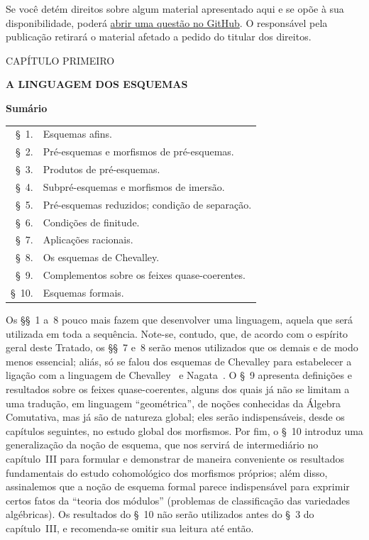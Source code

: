 \documentclass[oneside]{amsart}
\newcommand{\oldpage}[2][]{{\marginnote{\normalfont\textbf{#1}~|~#2}}\ignorespaces}
\let\EGAOriginalLabel\label
\renewcommand{\label}[1]{\phantomsection\EGAOriginalLabel{#1}}
\begin{document}
Se você detém direitos sobre algum material apresentado aqui e se opõe à sua disponibilidade, poderá \href{https://github.com/KokunoYumeto/ega-fga-sga-pt-br/issues}{abrir uma questão no GitHub}. O responsável pela publicação retirará o material afetado a pedido do titular dos direitos.

\par\endgroup\clearpage
\tableofcontents

\clearpage
\oldpage[I]{79}
\label{chapter:I-ptBR}

\begin{center}
{\large CAPÍTULO PRIMEIRO\par}
\vspace{1.5em}
{\Large\bfseries A LINGUAGEM DOS ESQUEMAS\par}
\vspace{1.8em}
{\bfseries Sumário\par}
\end{center}

\medskip
\begin{tabular}{@{}r@{\ }l@{}}
\S~1.  & Esquemas afins.\\
\S~2.  & Pré-esquemas e morfismos de pré-esquemas.\\
\S~3.  & Produtos de pré-esquemas.\\
\S~4.  & Subpré-esquemas e morfismos de imersão.\\
\S~5.  & Pré-esquemas reduzidos; condição de separação.\\
\S~6.  & Condições de finitude.\\
\S~7.  & Aplicações racionais.\\
\S~8.  & Os esquemas de Chevalley.\\
\S~9.  & Complementos sobre os feixes quase-coerentes.\\
\S~10. & Esquemas formais.
\end{tabular}

\medskip
Os \S\S~1 a~8 pouco mais fazem que desenvolver uma linguagem, aquela que será
utilizada em toda a sequência. Note-se, contudo, que, de acordo com o espírito
geral deste Tratado, os \S\S~7 e~8 serão menos utilizados que os demais e de
modo menos essencial; aliás, só se falou dos esquemas de Chevalley para
estabelecer a ligação com a linguagem de Chevalley~\cite{I-1} e
Nagata~\cite{I-9}. O \S~9 apresenta definições e resultados sobre os feixes
quase-coerentes, alguns dos quais já não se limitam a uma tradução, em
linguagem ``geométrica'', de noções conhecidas da Álgebra Comutativa, mas já
são de natureza global; eles serão indispensáveis, desde os capítulos
seguintes, no estudo global dos morfismos. Por fim, o \S~10 introduz uma
generalização da noção de esquema, que nos servirá de intermediário no
capítulo~III para formular e demonstrar de maneira conveniente os resultados
fundamentais do estudo cohomológico dos morfismos próprios; além disso,
assinalemos que a noção de esquema formal parece indispensável para exprimir
certos fatos da ``teoria dos módulos'' (problemas de classificação das
variedades algébricas). Os resultados do \S~10 não serão utilizados antes do
\S~3 do capítulo~III, e recomenda-se omitir sua leitura até então.
\end{document}
